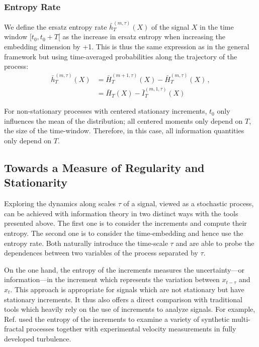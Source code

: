 \documentclass[aps,pra,groupedaddress,notitlepage]{revtex4-1}
\begin{document}
\subsubsection{{Entropy} Rate}

We define the ersatz entropy rate $\bar h_{T}^{(m,\tau)}(X)$ of the signal $X$ in the time window $[t_0,t_0+T[$ as the increase in ersatz entropy when increasing the embedding dimension by +1. This is thus the same expression as in the general framework but using time-averaged probabilities along the trajectory of the process:
%
\begin{subequations}
\begin{align}
\bar h_{T}^{(m,\tau)}(X) 
&= \bar{H}_{T}^{(m+1,\tau)}(X) - \bar{H}_{T}^{(m,\tau)}(X) \,, \label{eq:hT} \\
&=  \bar H_{T}(X) - \bar I_{T}^{(m,1,\tau)}(X) \label{eq:hT2}
\end{align}
\end{subequations}

For non-stationary processes with centered stationary increments, $t_0$ only influences the mean of the distribution; all centered moments only depend on $T$, the size of the time-window. Therefore, in this case, all information quantities only  depend on $T$. 


\subsection{Towards a Measure of Regularity and Stationarity}

Exploring the dynamics along scales $\tau$ of a signal, viewed as a stochastic process, can be achieved with information theory in two distinct ways with the tools presented above. The first one is to consider the increments and compute their entropy. The second one is to consider the time-embedding and hence use the entropy rate. Both naturally introduce the time-scale $\tau$ and are able to probe the dependences between two variables of the process separated by $\tau$.

On the one hand, the entropy of the increments measures the uncertainty---or information---in the increment which represents the variation between $x_{t-\tau}$ and $x_{t}$. This approach is appropriate for signals which are not stationary but have stationary increments. It thus also offers a direct comparison with traditional tools which heavily rely on the use of increments to analyze signals. For example, Ref. \cite{GraneroBelinchon2018} used the entropy of the increments to examine a variety of synthetic multi-fractal processes together with experimental velocity measurements in fully developed turbulence.
\end{document}
